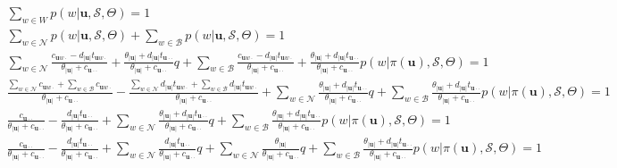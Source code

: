 \begin{equation}
\begin{split}
	\sum_{w\in W} p(w | \mathbf{u}, \mathcal{S}, \Theta) = 1 \\
    \sum_{w\in\mathcal{N}} p(w | \mathbf{u}, \mathcal{S}, \Theta) + \sum_{w\in\mathcal{B}} p(w | \mathbf{u}, \mathcal{S}, \Theta) = 1 \\
    \sum_{w\in\mathcal{N}}\frac{c_{\mathbf{u}w\cdot} - d_{|\mathbf{u}|}t_{\mathbf{u}w\cdot}}{\theta_{|\mathbf{u}|}+c_{\mathbf{u}\cdot\cdot}} + \frac{\theta_{|\mathbf{u}|} + d_{|\mathbf{u}|}t_{\mathbf{u}\cdot\cdot}}{\theta_{|\mathbf{u}|}+c_{\mathbf{u}\cdot\cdot}} q + \sum_{w\in\mathcal{B}}\frac{c_{\mathbf{u}w\cdot} - d_{|\mathbf{u}|}t_{\mathbf{u}w\cdot}}{\theta_{|\mathbf{u}|}+c_{\mathbf{u}\cdot\cdot}} + \frac{\theta_{|\mathbf{u}|} + d_{|\mathbf{u}|}t_{\mathbf{u}\cdot\cdot}}{\theta_{|\mathbf{u}|}+c_{\mathbf{u}\cdot\cdot}} p(w | \pi(\mathbf{u}), \mathcal{S}, \Theta) = 1 \\
	\frac{\sum_{w\in\mathcal{N}}c_{\mathbf{u}w\cdot} + \sum_{w\in\mathcal{B}}c_{\mathbf{u}w\cdot}}{\theta_{|\mathbf{u}|}+c_{\mathbf{u}\cdot\cdot}} - \frac{\sum_{w\in\mathcal{N}}d_{|\mathbf{u}|}t_{\mathbf{u}w\cdot} + \sum_{w\in\mathcal{B}}d_{|\mathbf{u}|}t_{\mathbf{u}w\cdot}}{\theta_{|\mathbf{u}|}+c_{\mathbf{u}\cdot\cdot}} + \sum_{w\in\mathcal{N}}\frac{\theta_{|\mathbf{u}|} + d_{|\mathbf{u}|}t_{\mathbf{u}\cdot\cdot}}{\theta_{|\mathbf{u}|}+c_{\mathbf{u}\cdot\cdot}} q + \sum_{w\in\mathcal{B}}\frac{\theta_{|\mathbf{u}|} + d_{|\mathbf{u}|}t_{\mathbf{u}\cdot\cdot}}{\theta_{|\mathbf{u}|}+c_{\mathbf{u}\cdot\cdot}} p(w | \pi(\mathbf{u}), \mathcal{S}, \Theta)= 1\\
    \frac{c_{\mathbf{u}\cdot\cdot}}{\theta_{|\mathbf{u}|}+c_{\mathbf{u}\cdot\cdot}} - \frac{d_{|\mathbf{u}|}t_{\mathbf{u}\cdot\cdot}}{\theta_{|\mathbf{u}|}+c_{\mathbf{u}\cdot\cdot}} + \sum_{w\in\mathcal{N}}\frac{\theta_{|\mathbf{u}|} + d_{|\mathbf{u}|}t_{\mathbf{u}\cdot\cdot}}{\theta_{|\mathbf{u}|}+c_{\mathbf{u}\cdot\cdot}} q + \sum_{w\in\mathcal{B}}\frac{\theta_{|\mathbf{u}|} + d_{|\mathbf{u}|}t_{\mathbf{u}\cdot\cdot}}{\theta_{|\mathbf{u}|}+c_{\mathbf{u}\cdot\cdot}} p(w | \pi(\mathbf{u}), \mathcal{S}, \Theta)= 1 \\
    \frac{c_{\mathbf{u}\cdot\cdot}}{\theta_{|\mathbf{u}|}+c_{\mathbf{u}\cdot\cdot}} - \frac{d_{|\mathbf{u}|}t_{\mathbf{u}\cdot\cdot}}{\theta_{|\mathbf{u}|}+c_{\mathbf{u}\cdot\cdot}} + \sum_{w\in\mathcal{N}}\frac{d_{|\mathbf{u}|}t_{\mathbf{u}\cdot\cdot}}{\theta_{|\mathbf{u}|}+c_{\mathbf{u}\cdot\cdot}} q + \sum_{w\in\mathcal{N}}\frac{\theta_{|\mathbf{u}|}}{\theta_{|\mathbf{u}|}+c_{\mathbf{u}\cdot\cdot}} q + \sum_{w\in\mathcal{B}}\frac{\theta_{|\mathbf{u}|} + d_{|\mathbf{u}|}t_{\mathbf{u}\cdot\cdot}}{\theta_{|\mathbf{u}|}+c_{\mathbf{u}\cdot\cdot}} p(w | \pi(\mathbf{u}), \mathcal{S}, \Theta)= 1 \\

\end{split}
\end{equation}
